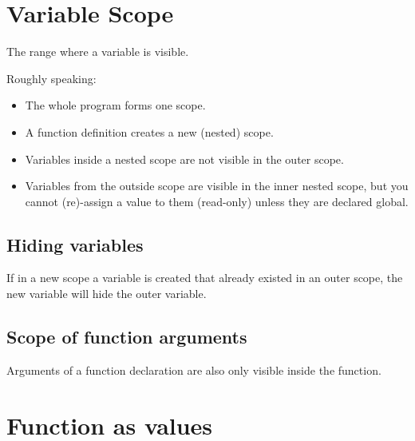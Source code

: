 \documentclass[aspectratio=1610,slidestop]{beamer}
\begin{document}
\section{Variable Scope}

\begin{pframe}
 The range where a variable is visible.
 \bigskip

 Roughly speaking:
 \begin{itemize}
  \item The whole program forms one scope.
  \item A function definition creates a new (nested) scope.
  \item Variables inside a nested scope are not visible in the outer scope.
  \item Variables from the outside scope are visible in the inner nested scope,
        but you cannot (re)-assign a value to them (read-only) unless they are
       declared global.
 \end{itemize}
\end{pframe}


\subsection{Hiding variables}
\begin{pframe}
 If in a new scope a variable is created that already existed in an outer scope,
 the new variable will hide the outer variable.
\end{pframe}


\subsection{Scope of function arguments}
\begin{pframe}
 Arguments of a function declaration are also only visible inside the function.
\end{pframe}


\section{Function as values}
\end{document}

